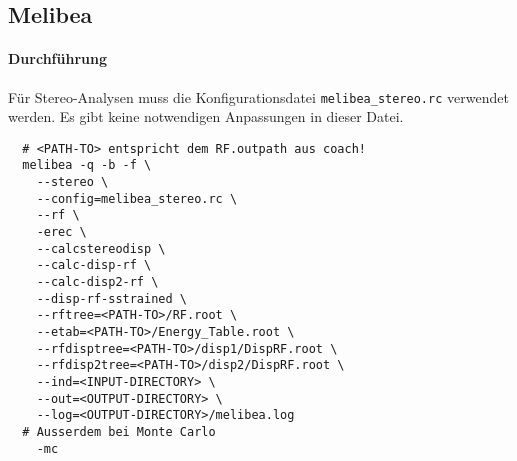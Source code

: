 \subsection{Melibea}%
\label{sub:melibea}

\paragraph{Durchführung}%

Für Stereo-Analysen muss die Konfigurationsdatei \texttt{melibea\_stereo.rc}
verwendet werden.
Es gibt keine notwendigen Anpassungen in dieser Datei.

\begin{lstlisting}
  # <PATH-TO> entspricht dem RF.outpath aus coach!
  melibea -q -b -f \
    --stereo \
    --config=melibea_stereo.rc \
    --rf \
    -erec \
    --calcstereodisp \
    --calc-disp-rf \
    --calc-disp2-rf \
    --disp-rf-sstrained \
    --rftree=<PATH-TO>/RF.root \
    --etab=<PATH-TO>/Energy_Table.root \
    --rfdisptree=<PATH-TO>/disp1/DispRF.root \
    --rfdisp2tree=<PATH-TO>/disp2/DispRF.root \
    --ind=<INPUT-DIRECTORY> \
    --out=<OUTPUT-DIRECTORY> \
    --log=<OUTPUT-DIRECTORY>/melibea.log
  # Ausserdem bei Monte Carlo
    -mc
\end{lstlisting}
